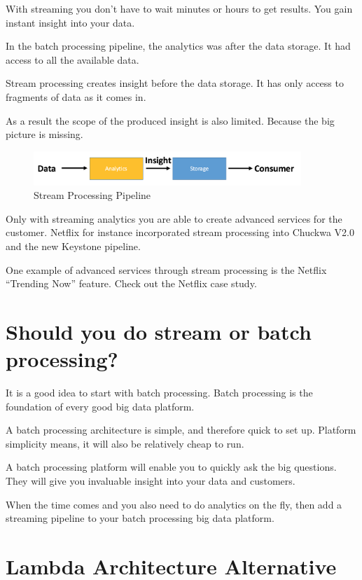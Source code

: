 \documentclass[12pt, numbers=noenddot]{scrreprt} %
\begin{document}
With streaming you don’t have to wait minutes or hours to get results. You gain instant insight into your data.

In the batch processing pipeline, the analytics was after the data storage. It had access to all the available data.

Stream processing creates insight before the data storage. It has only access to fragments of data as it comes in.

As a result the scope of the produced insight is also limited. Because the big picture is missing.

\begin{figure}[htbp]
  \centering
     \includegraphics[width=0.9\textwidth]{images/Simple-Stream-Processing-Workflow}
  \caption{Stream Processing Pipeline}
  \label{fig:Bild1}
\end{figure}

Only with streaming analytics you are able to create advanced services for the customer. Netflix for instance incorporated stream processing into Chuckwa V2.0 and the new Keystone pipeline.

One example of advanced services through stream processing is the Netflix “Trending Now” feature.
Check out the Netflix case study.

\section{Should you do stream or batch processing?}

It is a good idea to start with batch processing. Batch processing is the foundation of every good big data platform.

A batch processing architecture is simple, and therefore quick to set up. Platform simplicity means, it will also be relatively cheap to run.

A batch processing platform will enable you to quickly ask the big questions. They will give you invaluable insight into your data and customers.

When the time comes and you also need to do analytics on the fly, then add a streaming pipeline to your batch processing big data platform.


\section{Lambda Architecture Alternative }
\end{document}
